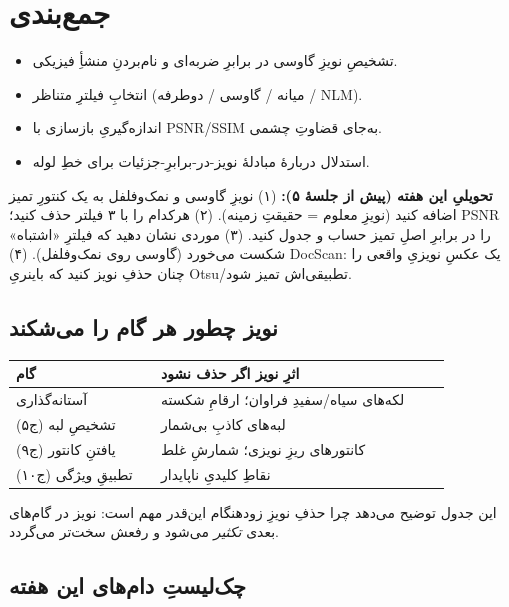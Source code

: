 \documentclass[12pt,a4paper]{article}
\begin{document}
\section{جمع‌بندی}

\begin{itemize}
  \item تشخیصِ نویزِ گاوسی در برابرِ ضربه‌ای و نام‌بردنِ منشأِ فیزیکی.
  \item انتخابِ فیلترِ متناظر (میانه / گاوسی / دوطرفه / NLM).
  \item اندازه‌گیریِ بازسازی با PSNR/SSIM به‌جای قضاوتِ چشمی.
  \item استدلال دربارهٔ مبادلهٔ نویز-در-برابرِ-جزئیات برای خطِ لوله.
\end{itemize}

\begin{tamrin}
\textbf{تحویلیِ این هفته (پیش از جلسهٔ ۵):} (۱) نویزِ گاوسی و نمک‌وفلفل به یک کنتورِ تمیز اضافه
کنید (نویزِ معلوم = حقیقتِ زمینه). (۲) هرکدام را با ۳ فیلتر حذف کنید؛ PSNR را در برابرِ اصلِ تمیز
حساب و جدول کنید. (۳) موردی نشان دهید که فیلترِ «اشتباه» شکست می‌خورد (گاوسی روی نمک‌وفلفل). (۴)
DocScan: یک عکسِ نویزیِ واقعی را چنان حذفِ نویز کنید که باینریِ Otsu/تطبیقی‌اش تمیز شود.
\end{tamrin}

\subsection*{نویز چطور هر گام را می‌شکند}

\begin{center}
\begin{tabular}{>{\raggedright\arraybackslash}p{0.3\linewidth} >{\raggedright\arraybackslash}p{0.6\linewidth}}
\toprule
\textbf{گام} & \textbf{اثرِ نویز اگر حذف نشود} \\
\midrule
آستانه‌گذاری & لکه‌های سیاه/سفیدِ فراوان؛ ارقامِ شکسته \\
تشخیصِ لبه (ج۵) & لبه‌های کاذبِ بی‌شمار \\
یافتنِ کانتور (ج۹) & کانتورهای ریزِ نویزی؛ شمارشِ غلط \\
تطبیقِ ویژگی (ج۱۰) & نقاطِ کلیدیِ ناپایدار \\
\bottomrule
\end{tabular}
\end{center}

این جدول توضیح می‌دهد چرا حذفِ نویزِ زودهنگام این‌قدر مهم است: نویز در گام‌های بعدی \emph{تکثیر}
می‌شود و رفعش سخت‌تر می‌گردد.

\subsection*{چک‌لیستِ دام‌های این هفته}
\end{document}
